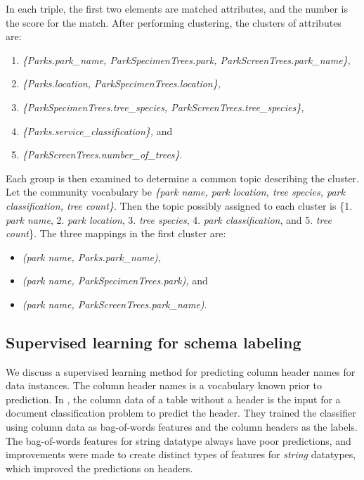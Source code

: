 In each triple, the first two elements are matched attributes, and the number is the score for the match. After performing clustering, the clusters of attributes are:
\begin{enumerate}
	\item \textit{\{Parks.park\_name, ParkSpecimenTrees.park, ParkScreenTrees.park\_name\},}
	\item \textit{\{Parks.location, ParkSpecimenTrees.location\},}
	\item \textit{\{ParkSpecimenTrees.tree\_species, ParkScreenTrees.tree\_species\},}
	\item \textit{\{Parks.service\_classification\},} and
	\item \textit{\{ParkScreenTrees.number\_of\_trees\}}.
\end{enumerate}

Each group is then examined to determine a common topic describing the cluster. Let the community vocabulary be \textit{\{park name, park location, tree species, park classification, tree count\}}. Then the topic possibly assigned to each cluster is \{1. \textit{park name}, 2. \textit{park location}, 3. \textit{tree species}, 4. \textit{park classification}, and 5. \textit{tree count}\}. The three mappings in the first cluster are:
\begin{itemize}
	\item[] \textit{(park name, Parks.park\_name),}
	\item[] \textit{(park name, ParkSpecimenTrees.park),} and
	\item[] \textit{(park name, ParkScreenTrees.park\_name)}.
\end{itemize}

\subsection{Supervised learning for schema labeling}
\label{ssec:SupervisedLearningForSchemaLabeling}

We discuss a supervised learning method for predicting column header names for data instances. The column header names is a vocabulary known prior to prediction. In \cite{10.1145/3184558.3191601}, the column data of a table without a header is the input for a document classification problem to predict the header. They trained the classifier using column data as bag-of-words features and the column headers as the labels. The bag-of-words features for string datatype always have poor predictions, and improvements were made to create distinct types of features for \textit{string} datatypes, which improved the predictions on headers.

